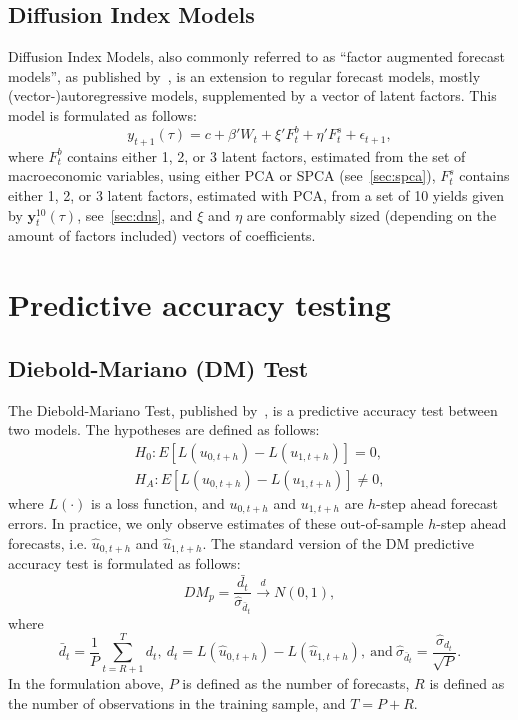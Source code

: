 \subsection{Diffusion Index Models}
\label{sec:dif}
Diffusion Index Models, also commonly referred to as \enquote{factor augmented forecast models}, as published by~\textcite[hereafter DIF]{Stock2002a,Stock2002b}, is an extension to regular forecast models, mostly (vector-)autoregressive models, supplemented by a vector of latent factors. 
This model is formulated as follows:
\begin{equation}
	y_{t+1}(\tau) = c + \beta' W_t + \xi' F_t^b + \eta' F_t^s + \epsilon_{t+1},
\end{equation}
where $F_t^b$ contains either 1, 2, or 3 latent factors, estimated from the set of macroeconomic variables, using either PCA or SPCA (see~\cref{sec:spca}), $F_t^s$ contains either 1, 2, or 3 latent factors, estimated with PCA, from a set of 10 yields given by $\mathbf{y}_t^{10}(\tau)$, see~\cref{sec:dns}, and $\xi$ and $\eta$ are conformably sized (depending on the amount of factors included) vectors of coefficients. 

\section{Predictive accuracy testing}
\subsection{Diebold-Mariano (DM) Test}
\label{sec:dmtest}
The Diebold-Mariano Test, published by~\textcite[hereafter DM]{Diebold1994}, is a predictive accuracy test between two models. The hypotheses are defined as follows:
\begin{align*}
	H_0 : E\left[L(u_{0,t+h}) - L(u_{1,t+h})\right] = 0, \\
	H_A : E\left[L(u_{0,t+h}) - L(u_{1,t+h})\right] \neq 0,
\end{align*}
where $L(\cdot)$ is a loss function, and $u_{0,t+h}$ and $u_{1,t+h}$ are $h$-step ahead forecast errors. In practice, we only observe estimates of these out-of-sample $h$-step ahead forecasts, i.e. $\hat{u}_{0,t+h}$ and $\hat{u}_{1,t+h}$. The standard version of the DM predictive accuracy test is formulated as follows:
\begin{equation}
	DM_p = \frac{\bar{d_t}}{\hat{\sigma}_{\bar{d}_t}} \overset{d}{\rightarrow} N(0,1),
\end{equation}
where
\begin{equation}
	\bar{d}_t = \frac{1}{P} \sum_{t=R+1}^{T} d_t,\ d_t = L(\hat{u}_{0,t+h}) - L(\hat{u}_{1,t+h}),\ \text{and}\ \hat{\sigma}_{\bar{d}_t} = \frac{\hat{\sigma}_{d_t}}{\sqrt{P}}.
\end{equation}
In the formulation above, $P$ is defined as the number of forecasts, $R$ is defined as the number of observations in the training sample, and $T = P + R$. 
